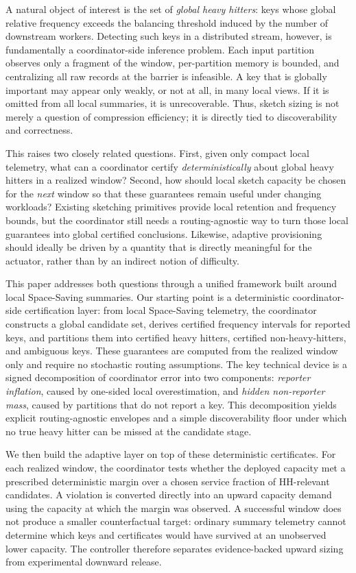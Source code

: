 \documentclass[sigconf, nonacm]{acmart}
\begin{document}
A natural object of interest is the set of \emph{global heavy hitters}: keys whose global relative frequency exceeds the balancing threshold induced by the number of downstream workers. Detecting such keys in a distributed stream, however, is fundamentally a coordinator-side inference problem. Each input partition observes only a fragment of the window, per-partition memory is bounded, and centralizing all raw records at the barrier is infeasible. A key that is globally important may appear only weakly, or not at all, in many local views. If it is omitted from all local summaries, it is unrecoverable. Thus, sketch sizing is not merely a question of compression efficiency; it is directly tied to discoverability and correctness.

This raises two closely related questions. First, given only compact local telemetry, what can a coordinator certify \emph{deterministically} about global heavy hitters in a realized window? Second, how should local sketch capacity be chosen for the \emph{next} window so that these guarantees remain useful under changing workloads? Existing sketching primitives provide local retention and frequency bounds, but the coordinator still needs a routing-agnostic way to turn those local guarantees into global certified conclusions. Likewise, adaptive provisioning should ideally be driven by a quantity that is directly meaningful for the actuator, rather than by an indirect notion of difficulty.

This paper addresses both questions through a unified framework built around local Space-Saving summaries. Our starting point is a deterministic coordinator-side certification layer: from local Space-Saving telemetry, the coordinator constructs a global candidate set, derives certified frequency intervals for reported keys, and partitions them into certified heavy hitters, certified non-heavy-hitters, and ambiguous keys. These guarantees are computed from the realized window only and require no stochastic routing assumptions. The key technical device is a signed decomposition of coordinator error into two components: \emph{reporter inflation}, caused by one-sided local overestimation, and \emph{hidden non-reporter mass}, caused by partitions that do not report a key. This decomposition yields explicit routing-agnostic envelopes and a simple discoverability floor under which no true heavy hitter can be missed at the candidate stage.

We then build the adaptive layer on top of these deterministic certificates. For each realized window, the coordinator tests whether the deployed capacity met a prescribed deterministic margin over a chosen service fraction of HH-relevant candidates. A violation is converted directly into an upward capacity demand using the capacity at which the margin was observed. A successful window does not produce a smaller counterfactual target: ordinary summary telemetry cannot determine which keys and certificates would have survived at an unobserved lower capacity. The controller therefore separates evidence-backed upward sizing from experimental downward release.
\end{document}

